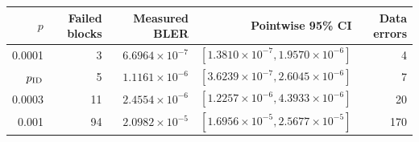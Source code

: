 \begin{tabular}{rrrrr}
\toprule
$p$ & Failed blocks & Measured BLER & Pointwise 95\% CI & Data errors \\
\midrule
0.0001 & 3 & $6.6964\times10^{-7}$ & $[1.3810\times10^{-7}, 1.9570\times10^{-6}]$ & 4 \\
$p_{\rm ID}$ & 5 & $1.1161\times10^{-6}$ & $[3.6239\times10^{-7}, 2.6045\times10^{-6}]$ & 7 \\
0.0003 & 11 & $2.4554\times10^{-6}$ & $[1.2257\times10^{-6}, 4.3933\times10^{-6}]$ & 20 \\
0.001 & 94 & $2.0982\times10^{-5}$ & $[1.6956\times10^{-5}, 2.5677\times10^{-5}]$ & 170 \\
\bottomrule
\end{tabular}
